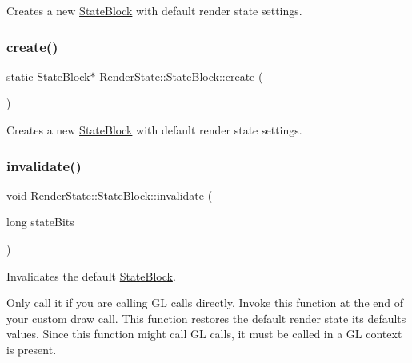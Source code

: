 Creates a new \hyperlink{classRenderState_1_1StateBlock}{State\+Block} with default render state settings. \mbox{\label{classRenderState_1_1StateBlock_a0cde83688ecef4d80b19953503b34ea5}} 
\subsubsection{\texorpdfstring{create()}{create()}\hspace{0.1cm}{\footnotesize\ttfamily [2/2]}}
{\footnotesize\ttfamily static \hyperlink{classRenderState_1_1StateBlock}{State\+Block}$\ast$ Render\+State\+::\+State\+Block\+::create (\begin{DoxyParamCaption}{ }\end{DoxyParamCaption})\hspace{0.3cm}{\ttfamily [static]}}

Creates a new \hyperlink{classRenderState_1_1StateBlock}{State\+Block} with default render state settings. \mbox{\label{classRenderState_1_1StateBlock_a05ce75099029c8cc41f96328df911bd0}} 
\subsubsection{\texorpdfstring{invalidate()}{invalidate()}\hspace{0.1cm}{\footnotesize\ttfamily [1/2]}}
{\footnotesize\ttfamily void Render\+State\+::\+State\+Block\+::invalidate (\begin{DoxyParamCaption}\item[{long}]{state\+Bits }\end{DoxyParamCaption})\hspace{0.3cm}{\ttfamily [static]}}

Invalidates the default \hyperlink{classRenderState_1_1StateBlock}{State\+Block}.

Only call it if you are calling GL calls directly. Invoke this function at the end of your custom draw call. This function restores the default render state its defaults values. Since this function might call GL calls, it must be called in a GL context is present.



